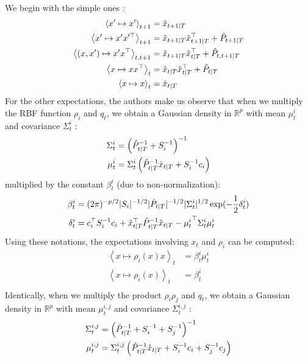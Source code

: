 We begin with the simple ones :
\begin{align*}
  \left< x' \mapsto x'\right>_{t+1} &= \hat{x}_{t+1 \mathbin{\vert} T}\\
  \left< x' \mapsto x'x'^{\top}\right>_{t+1} &= \hat{x}_{t+1 \mathbin{\vert} T}\hat{x}_{t+1 \mathbin{\vert} T}^{\top} + \hat{P}_{t+1 \mathbin{\vert} T}\\
  \left< (x,x') \mapsto x'x^{\top}\right>_{t,t+1} &= \hat{x}_{t+1 \mathbin{\vert} T} \hat{x}_{t \mathbin{\vert} T}^{\top} + \hat{P}_{t,t+1 \mathbin{\vert} T}\\
  \left< x \mapsto xx^{\top}\right>_{t} &= \hat{x}_{t \mathbin{\vert} T} \hat{x}_{t \mathbin{\vert} T}^{\top} + \hat{P}_{t \mathbin{\vert} T}\\
  \left< x \mapsto x\right>_{t} &= \hat{x}_{t \mathbin{\vert} T}\\
\end{align*}
For the other expectations, the authors make us observe that when we multiply the RBF function $\rho_i$ and $q_t$, we obtain a Gaussian density in $\mathbb{R}^p$ with mean $\mu^i_t$ and covariance $\Sigma^i_t$ :
\begin{align*}
  \Sigma^i_t &= \left( \hat{P}_{t \mathbin{\vert} T}^{-1} + S_i^{-1} \right)^{-1}\\
  \mu^i_t &= \Sigma^i_t \left( \hat{P}_{t \mathbin{\vert} T}^{-1} \hat{x}_{t \mathbin{\vert} T} + S_i^{-1}c_i \right)\\
\end{align*}
multiplied by the constant $\beta^i_t$ (due to non-normalization):
\begin{align*}
  \beta^i_t &= (2\pi)^{-p/2} |S_i|^{-1/2} |\hat{P}_{t|T}|^{-1/2} |\Sigma^i_t|^{1/2} \exp(-\frac{1}{2} \delta^i_t)\\
  \delta^i_t &= c_i^{\top} S_i^{-1} c_i + \hat{x}_{t \mathbin{\vert} T}^{\top} \hat{P}_{t \mathbin{\vert} T}^{-1} \hat{x}_{t \mathbin{\vert} T} - {\mu^i_t}^{\top} \Sigma^i_t \mu^i_t\\
\end{align*}
Using these notations, the expectations involving $x_t$ and $\rho_i$ can be computed:
\begin{align*}
  \left< x \mapsto \rho_i(x) x \right>_{t} &= \beta^i_t \mu^i_t\\
  \left< x \mapsto \rho_i(x) \right>_{t} &= \beta^i_t\\
\end{align*}
Identically, when we multiply the product $\rho_i \rho_j$ and $q_t$, we obtain a Gaussian density in $\mathbb{R}^p$ with mean $\mu^{i,j}_t$ and covariance $\Sigma^{i,j}_t$ :
\begin{align*}
  \Sigma^{i,j}_t &= \left( \hat{P}_{t \mathbin{\vert} T}^{-1} + S_i^{-1} + S_j^{-1} \right)^{-1}\\
  \mu^{i,j}_t &= \Sigma^{i,j}_t \left( \hat{P}_{t \mathbin{\vert} T}^{-1} \hat{x}_{t \mathbin{\vert} T} + S_i^{-1}c_i + S_j^{-1}c_j \right)\\
\end{align*}

